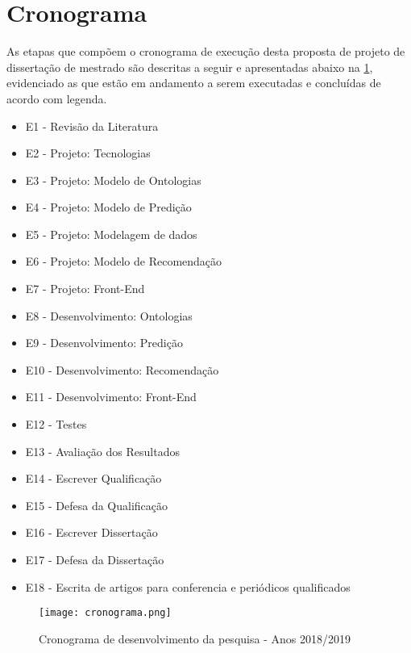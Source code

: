 \section{Cronograma}
\label{sec:cron}

As etapas que compõem o cronograma de execução desta proposta de projeto de dissertação de mestrado são descritas a seguir e apresentadas abaixo na \ref{fig:cronograma}, evidenciado as que estão em andamento a serem executadas e concluídas de acordo com legenda.

\begin{itemize}
	\item E1 - Revisão da Literatura
	\item E2 - Projeto: Tecnologias
	\item E3 - Projeto: Modelo de Ontologias
	\item E4 - Projeto: Modelo de Predição
	\item E5 - Projeto: Modelagem de dados
	\item E6 - Projeto: Modelo de Recomendação
	\item E7 - Projeto: Front-End
	\item E8 - Desenvolvimento: Ontologias
	\item E9 - Desenvolvimento: Predição
	\item E10 - Desenvolvimento: Recomendação
	\item E11 - Desenvolvimento: Front-End
	\item E12 - Testes
	\item E13 - Avaliação dos Resultados
	\item E14 - Escrever Qualificação
	\item E15 - Defesa da Qualificação
	\item E16 - Escrever Dissertação
	\item E17 - Defesa da Dissertação
	\item E18 - Escrita de artigos para conferencia e periódicos qualificados
\end{itemize}

\begin{figure}[]
	\centering					            
	{\texttt{[image: cronograma.png]}}
	
	\caption{Cronograma de desenvolvimento da pesquisa - Anos 2018/2019}
	\label{fig:cronograma}
\end{figure}
